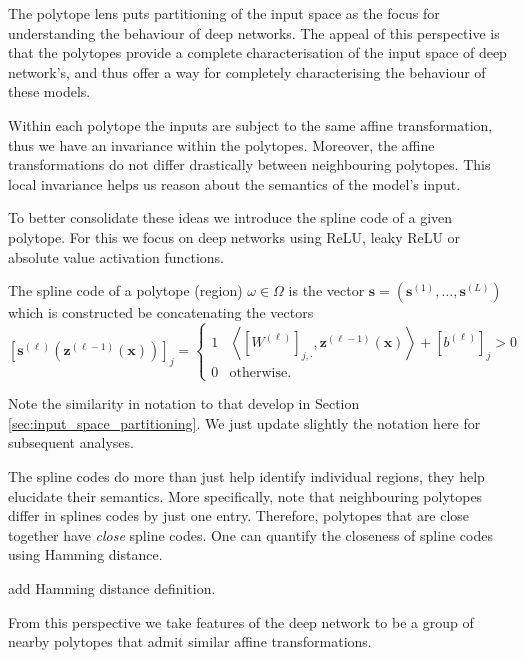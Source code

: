 The polytope lens puts partitioning of the input space as the focus for understanding the behaviour of deep networks. The appeal of this perspective is that the polytopes provide a complete characterisation of the input space of deep network's, and thus offer a way for completely characterising the behaviour of these models. 

Within each polytope the inputs are subject to the same affine transformation, thus we have an invariance within the polytopes. Moreover, the affine transformations do not differ drastically between neighbouring polytopes. This local invariance helps us reason about the semantics of the model's input.

To better consolidate these ideas we introduce the spline code of a given polytope. For this we focus on deep networks using ReLU, leaky ReLU or absolute value activation functions.

\begin{definition}
    The spline code of a polytope (region) $\omega\in\Omega$ is the vector $\mathbf{s}=\left(\mathbf{s}^{(1)},\dots,\mathbf{s}^{(L)}\right)$ which is constructed be concatenating the vectors $$\left[\mathbf{s}^{(\ell)}\left(\mathbf{z}^{(\ell-1)}(\mathbf{x})\right)\right]_{j}=\begin{cases}1&\left\langle\left[W^{(\ell)}\right]_{j,\cdot},\mathbf{z}^{(\ell-1)}(\mathbf{x})\right\rangle+\left[b^{(\ell)}\right]_j>0\\0&\text{otherwise.}\end{cases}$$
\end{definition}

\begin{remark}
    Note the similarity in notation to that develop in Section \ref{sec:input_space_partitioning}. We just update slightly the notation here for subsequent analyses.
\end{remark}

The spline codes do more than just help identify individual regions, they help elucidate their semantics. More specifically, note that neighbouring polytopes differ in splines codes by just one entry. Therefore, polytopes that are close together have \emph{close} spline codes. One can quantify the closeness of spline codes using Hamming distance.

\begin{definition}
    \TODO add Hamming distance definition.
\end{definition}

From this perspective we take features of the deep network to be a group of nearby polytopes that admit similar affine transformations. 


